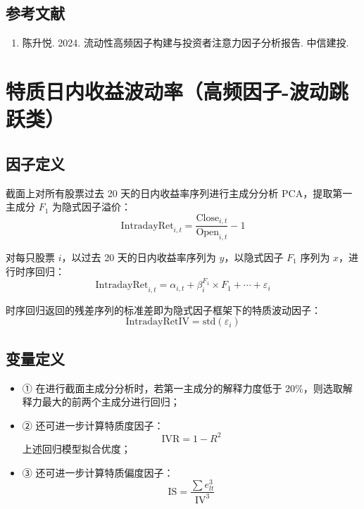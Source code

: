 \documentclass{article}
\begin{document}
\subsection{参考文献}
\begin{enumerate}
    \item 陈升悦. 2024. 流动性高频因子构建与投资者注意力因子分析报告. 中信建投.
\end{enumerate}

\section{特质日内收益波动率（高频因子-波动跳跃类）}

\subsection{因子定义}

截面上对所有股票过去 20 天的日内收益率序列进行主成分分析 PCA，提取第一主成分 \( F_1 \) 为隐式因子溢价：
\begin{equation}
    \mathrm{IntradayRet}_{i,t} = \frac{\mathrm{Close}_{i,t}}{\mathrm{Open}_{i,t}} - 1
\end{equation}

对每只股票 \( i \)，以过去 20 天的日内收益率序列为 \( y \)，以隐式因子 \( F_1 \) 序列为 \( x \)，进行时序回归：
\begin{equation}
    \mathrm{IntradayRet}_{i,t} = \alpha_{i,t} + \beta_i^{F_1} \times F_1 + \cdots + \varepsilon_i
\end{equation}

时序回归返回的残差序列的标准差即为隐式因子框架下的特质波动因子：
\begin{equation}
    \mathrm{IntradayRetIV} = \mathrm{std}(\varepsilon_i)
\end{equation}

\subsection{变量定义}
\begin{itemize}
    \item ① 在进行截面主成分分析时，若第一主成分的解释力度低于 20\%，则选取解释力最大的前两个主成分进行回归；
    \item ② 还可进一步计算特质度因子：
        \begin{equation*}
            \mathrm{IVR} = 1 - R^2
        \end{equation*}
        上述回归模型拟合优度；
    \item ③ 还可进一步计算特质偏度因子：
        \begin{equation*}
            \mathrm{IS} = \frac{\sum e_{lt}^3}{\mathrm{IV}^3}
        \end{equation*}
\end{itemize}
\end{document}
